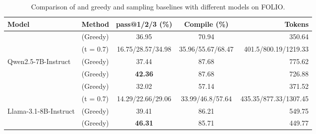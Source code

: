 \begin{table*}[t]
    \centering
    \small
    \caption{Comparison of \Tool{} and greedy and sampling baselines with different models on FOLIO.}
    \begin{tabular}{llccr}
        \toprule
        \textbf{Model} & \textbf{Method} & \textbf{pass@1/2/3 (\%)} & \textbf{Compile (\%)} &  \textbf{Tokens} \\
    \midrule
    & \cotUnconstrained{} (Greedy) & 36.95 & 70.94 & 350.64  \\
    & \cotUnconstrained{} (t = 0.7) & 16.75/28.57/34.98 & 35.96/55.67/68.47 & 401.5/800.19/1219.33  \\
 Qwen2.5-7B-Instruct & \stdConstrained{} (Greedy) & 37.44 & 87.68 & 775.62 \\
 & \textbf{\Tool{}} (Greedy) & \textbf{42.36} & 87.68 & 726.88  \\

 \midrule
     & \cotUnconstrained{} (Greedy) & 32.02 & 57.14 & 371.52  \\
     & \cotUnconstrained{} (t = 0.7) & 14.29/22.66/29.06 & 33.99/46.8/57.64 & 435.35/877.33/1307.45  \\
 Llama-3.1-8B-Instruct & \stdConstrained{} (Greedy) & 39.41 & 86.21 & 549.75  \\
 & \textbf{\Tool{}} (Greedy) & \textbf{46.31} & 85.71 & 449.77  \\




\bottomrule
    \end{tabular}
    \label{tab:rejection_sample_fol}
    \vspace{-.2in}
\end{table*}